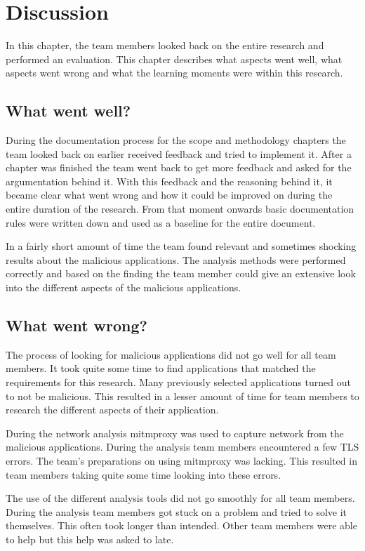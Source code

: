 \section{Discussion}
In this chapter, the team members looked back on the entire research and performed an evaluation.
This chapter describes what aspects went well, what aspects went wrong and what the learning moments were within this research.

\subsection{What went well?}
During the documentation process for the scope and methodology chapters the team looked back on earlier received feedback and tried to implement it.
After a chapter was finished the team went back to get more feedback and asked for the argumentation behind it.
With this feedback and the reasoning behind it, it became clear what went wrong and how it could be improved on during the entire duration of the research.
From that moment onwards basic documentation rules were written down and used as a baseline for the entire document.

In a fairly short amount of time the team found relevant and sometimes shocking results about the malicious applications.
The analysis methods were performed correctly and based on the finding the team member could give an extensive look into the different aspects of the malicious applications.

\subsection{What went wrong?}
The process of looking for malicious applications did not go well for all team members.
It took quite some time to find applications that matched the requirements for this research.
Many previously selected applications turned out to not be malicious.
This resulted in a lesser amount of time for team members to research the different aspects of their application.

During the network analysis mitmproxy was used to capture network from the malicious applications.
During the analysis team members encountered a few TLS errors.
The team’s preparations on using mitmproxy was lacking.
This resulted in team members taking quite some time looking into these errors.

The use of the different analysis tools did not go smoothly for all team members.
During the analysis team members got stuck on a problem and tried to solve it themselves.
This often took longer than intended.
Other team members were able to help but this help was asked to late.
 
